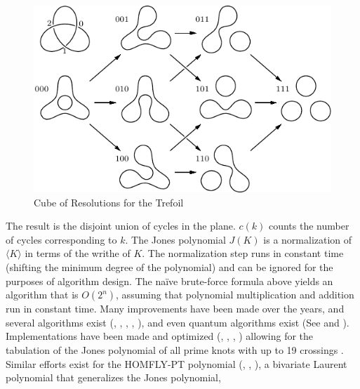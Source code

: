 \documentclass{article}
\theoremstyle{plain}
\begin{document}
        \begin{figure}
            \centering
            \includegraphics{trefoil_knot_cube_of_resolutions.pdf}
            \caption{Cube of Resolutions for the Trefoil}
            \label{fig:cube_of_resolutions}
        \end{figure}
        The result is the disjoint union of
        cycles in the plane. $c(k)$ counts the number of cycles corresponding
        to $k$. The Jones polynomial $J(K)$ is a normalization of
        $\langle{K}\rangle$ in terms of the writhe of $K$. The normalization
        step runs in constant time
        (shifting the minimum degree of the polynomial) and can be ignored for
        the purposes of algorithm design. The na\"{i}ve brute-force formula
        above yields an algorithm that is $O(2^{n})$, assuming that
        polynomial multiplication and addition run in constant time.
        Many improvements have been made over the years, and several
        algorithms exist (\cite{Thistlethwaite1987SpanningTreeJones},
        \cite{Zulli1995MatrixForJonesPolynomial},
        \cite{ElMisieryElHorbatyJonesAlgorithm},
        \cite{Gousbet2001JonesAlgorithm},
        \cite{MustafaLevitt2018JonesAlgorithm}), and even quantum algorithms
        exist (See \cite{JonesQuantumAlgorithm} and \cite{Lomonaco2008AQM}).
        Implementations have been made
        and optimized (\cite{sage}, \cite{regina},
        \cite{SnapPy}, \cite{libtmpl})
        allowing for the tabulation of the Jones polynomial of
        all prime knots with up to 19 crossings
        \cite{JonesData}. Similar efforts exist for the HOMFLY-PT polynomial
        (\cite{Gousbet1999HOMFLYAlgorithm},
        \cite{Burton2018HOMFLFixedParameter},
        \cite{Burton2012ComputationalTW}),
        a bivariate Laurent polynomial that generalizes the Jones polynomial,
\end{document}
